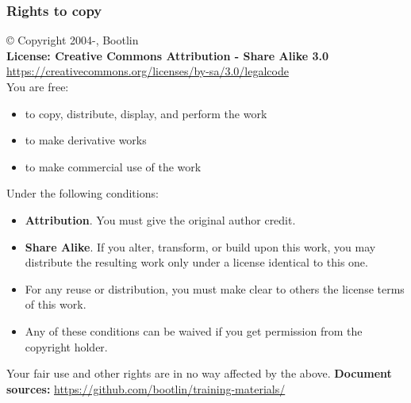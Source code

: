 \begin{frame}
\frametitle{Rights to copy}
   \scriptsize
   © Copyright 2004-\the\year, Bootlin \\
   {\bf License: Creative Commons Attribution - Share Alike 3.0} \\
   \url{https://creativecommons.org/licenses/by-sa/3.0/legalcode} \\

   You are free:
   \begin{itemize}
     \item to copy, distribute, display, and perform the work
     \item to make derivative works
     \item to make commercial use of the work
   \end{itemize}

   Under the following conditions:
   \begin{itemize}
     \item {\bf Attribution}. You must give the original author credit.
     \item {\bf Share Alike}. If you alter, transform, or build upon
           this work, you may distribute the resulting work only under
           a license identical to this one.
     \item For any reuse or distribution, you must make clear to others
           the license terms of this work.
     \item Any of these conditions can be waived if you get permission
           from the copyright holder.
    \end{itemize}

    Your fair use and other rights are in no way affected by the above.
    \vfill
    {\bf Document sources:}
    \url{https://github.com/bootlin/training-materials/} \\
\end{frame}
